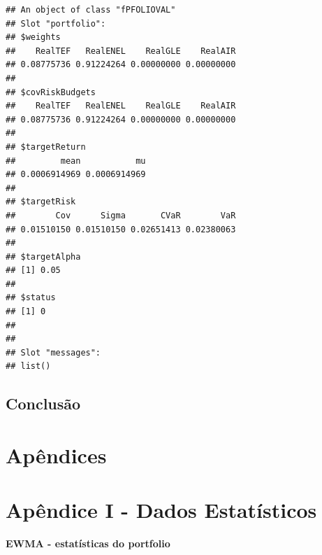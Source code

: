 \documentclass[
  12pt,
  a4paper,
  openany]{book}
\begin{document}
\begin{verbatim}
## An object of class "fPFOLIOVAL"
## Slot "portfolio":
## $weights
##    RealTEF   RealENEL    RealGLE    RealAIR 
## 0.08775736 0.91224264 0.00000000 0.00000000 
## 
## $covRiskBudgets
##    RealTEF   RealENEL    RealGLE    RealAIR 
## 0.08775736 0.91224264 0.00000000 0.00000000 
## 
## $targetReturn
##         mean           mu 
## 0.0006914969 0.0006914969 
## 
## $targetRisk
##        Cov      Sigma       CVaR        VaR 
## 0.01510150 0.01510150 0.02651413 0.02380063 
## 
## $targetAlpha
## [1] 0.05
## 
## $status
## [1] 0
## 
## 
## Slot "messages":
## list()
\end{verbatim}

\hypertarget{conclusuxe3o}{%
\chapter*{Conclusão}\label{conclusuxe3o}}

  

\part*{Apêndices}

\newpage
\part*{\normalfont\huge\bfseries\centering Apêndice I - Dados Estatísticos}
\newpage

\begin{center}
 {\normalfont\Large\bfseries EWMA - estatísticas do portfolio}
\end{center}
\end{document}
